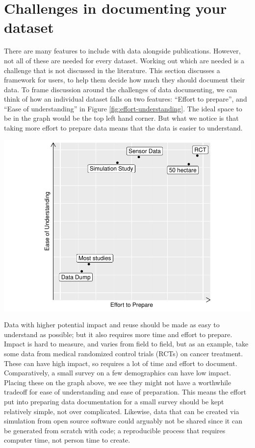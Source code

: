 \documentclass[
]{article}
\let\origfigure\figure
\let\endorigfigure\endfigure
\renewenvironment{figure}[1][2] {
    \expandafter\origfigure\expandafter[H]
} {
    \endorigfigure
}
\begin{document}
\hypertarget{doco-challenge}{%
\section{Challenges in documenting your dataset}\label{doco-challenge}}

There are many features to include with data alongside publications. However, not all of these are needed for every dataset. Working out which are needed is a challenge that is not discussed in the literature. This section discusses a framework for users, to help them decide how much they should document their data. To frame discussion around the challenges of data documenting, we can think of how an individual dataset falls on two features: ``Effort to prepare'', and ``Ease of understanding'' in Figure \ref{fig:effort-understanding}. The ideal space to be in the graph would be the top left hand corner. But what we notice is that taking more effort to prepare data means that the data is easier to understand.

\begin{figure}
\includegraphics[width=0.9\linewidth]{paper_files/figure-latex/effort-understanding-1} \caption{There is a big difference in the effort to prepare data, and how easy it is to understand - look at the difference between most datasets, and something like a Randomized Control Trial (RCT).}\label{fig:effort-understanding}
\end{figure}

Data with higher potential impact and reuse should be made as easy to understand as possible; but it also requires more time and effort to prepare. Impact is hard to measure, and varies from field to field, but as an example, take some data from medical randomized control trials (RCTs) on cancer treatment. These can have high impact, so requires a lot of time and effort to document. Comparatively, a small survey on a few demographics can have low impact. Placing these on the graph above, we see they might not have a worthwhile tradeoff for ease of understanding and ease of preparation. This means the effort put into preparing data documentation for a small survey should be kept relatively simple, not over complicated. Likewise, data that can be created via simulation from open source software could arguably not be shared since it can be generated from scratch with code; a reproducible process that requires computer time, not person time to create.
\end{document}
